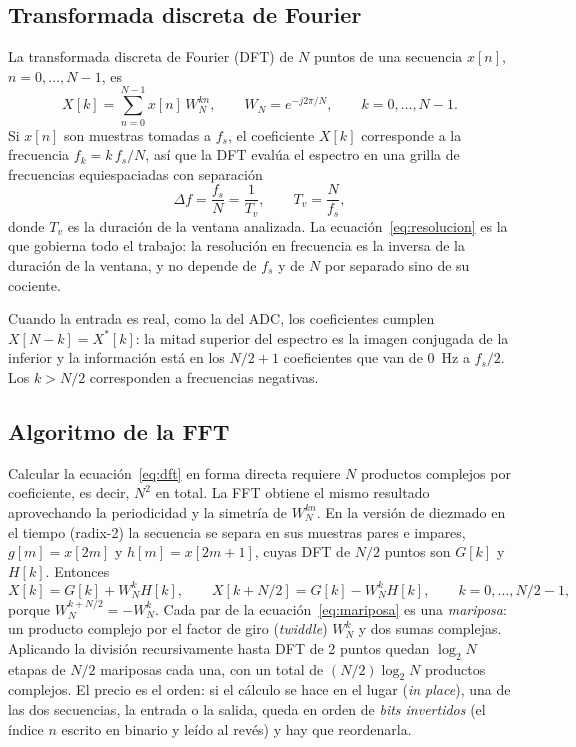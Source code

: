 \documentclass[11pt,a4paper]{article}
\begin{document}
\subsection{Transformada discreta de Fourier}

La transformada discreta de Fourier (DFT) de $N$ puntos de una secuencia
$x[n]$, $n = 0, \dots, N-1$, es
\begin{equation}
  X[k] = \sum_{n=0}^{N-1} x[n]\, W_N^{kn},
  \qquad W_N = e^{-j 2\pi / N},
  \qquad k = 0, \dots, N-1.
  \label{eq:dft}
\end{equation}
Si $x[n]$ son muestras tomadas a $f_s$, el coeficiente $X[k]$ corresponde a
la frecuencia $f_k = k\, f_s / N$, así que la DFT evalúa el espectro en una
grilla de frecuencias equiespaciadas con separación
\begin{equation}
  \Delta f = \frac{f_s}{N} = \frac{1}{T_v},
  \qquad T_v = \frac{N}{f_s},
  \label{eq:resolucion}
\end{equation}
donde $T_v$ es la duración de la ventana analizada. La
ecuación~\eqref{eq:resolucion} es la que gobierna todo el trabajo: la
resolución en frecuencia es la inversa de la duración de la ventana, y no
depende de $f_s$ y de $N$ por separado sino de su cociente.

Cuando la entrada es real, como la del ADC, los coeficientes cumplen
$X[N-k] = X^*[k]$: la mitad superior del espectro es la imagen conjugada de
la inferior y la información está en los $N/2+1$ coeficientes que van de
\qty{0}{\hertz} a $f_s/2$. Los $k > N/2$ corresponden a frecuencias
negativas.

\subsection{Algoritmo de la FFT}

Calcular la ecuación~\eqref{eq:dft} en forma directa requiere $N$ productos
complejos por coeficiente, es decir, $N^2$ en total. La FFT obtiene el mismo
resultado aprovechando la periodicidad y la simetría de $W_N^{kn}$. En la
versión de diezmado en el tiempo (radix-2) la secuencia se separa en sus
muestras pares e impares, $g[m] = x[2m]$ y $h[m] = x[2m+1]$, cuyas DFT de
$N/2$ puntos son $G[k]$ y $H[k]$. Entonces
\begin{equation}
  X[k] = G[k] + W_N^{k} H[k], \qquad
  X[k + N/2] = G[k] - W_N^{k} H[k], \qquad
  k = 0, \dots, N/2 - 1,
  \label{eq:mariposa}
\end{equation}
porque $W_N^{k+N/2} = -W_N^{k}$. Cada par de la
ecuación~\eqref{eq:mariposa} es una \emph{mariposa}: un producto complejo
por el factor de giro (\emph{twiddle}) $W_N^k$ y dos sumas complejas.
Aplicando la división recursivamente hasta DFT de 2 puntos quedan
$\log_2 N$ etapas de $N/2$ mariposas cada una, con un total de
$(N/2)\log_2 N$ productos complejos. El precio es el orden: si el cálculo se
hace en el lugar (\emph{in place}), una de las dos secuencias, la entrada o
la salida, queda en orden de \emph{bits invertidos} (el índice $n$ escrito
en binario y leído al revés) y hay que reordenarla.
\end{document}
